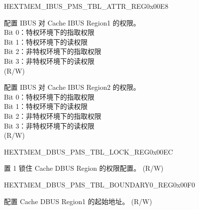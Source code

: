 \begin{register}{H}{EXTMEM\_IBUS\_PMS\_TBL\_ATTR\_REG}{0x00E8}\label{regdesc:EXTMEMIBUSPMSTBLATTRREG}
%
%
%
\regnewline%
\begin{regdesc}\begin{reglist}
\label{fielddesc:EXTMEMIBUSPMSSCT1ATTR}\item [EXTMEM\_IBUS\_PMS\_SCT1\_ATTR] 配置 IBUS 对 Cache IBUS Region1 的权限。\\
Bit 0：特权环境下的指取权限\\
Bit 1：特权环境下的读权限\\
Bit 2：非特权环境下的指取权限\\
Bit 3：非特权环境下的读权限\\
(R/W)
\label{fielddesc:EXTMEMIBUSPMSSCT2ATTR}\item [EXTMEM\_IBUS\_PMS\_SCT2\_ATTR] 配置 IBUS 对 Cache IBUS Region2 的权限。\\
Bit 0：特权环境下的指取权限\\
Bit 1：特权环境下的读权限\\
Bit 2：非特权环境下的指取权限\\
Bit 3：非特权环境下的读权限\\
(R/W)
\end{reglist}\end{regdesc}
\end{register}


\begin{register}{H}{EXTMEM\_DBUS\_PMS\_TBL\_LOCK\_REG}{0x00EC}\label{regdesc:EXTMEMDBUSPMSTBLLOCKREG}
%
%
\regnewline%
\begin{regdesc}\begin{reglist}
\label{fielddesc:EXTMEMDBUSPMSLOCK}\item [EXTMEM\_DBUS\_PMS\_LOCK] 置 1 锁住 Cache DBUS Region 的权限配置。 (R/W)
\end{reglist}\end{regdesc}
\end{register}

\begin{register}{H}{EXTMEM\_DBUS\_PMS\_TBL\_BOUNDARY0\_REG}{0x00F0}\label{regdesc:EXTMEMDBUSPMSTBLBOUNDARY0REG}
%
%
\regnewline%
\begin{regdesc}\begin{reglist}
\label{fielddesc:EXTMEMDBUSPMSBOUNDARY0}\item [EXTMEM\_DBUS\_PMS\_BOUNDARY0] 配置 Cache DBUS Region1 的起始地址。 (R/W)
\end{reglist}\end{regdesc}
\end{register}


